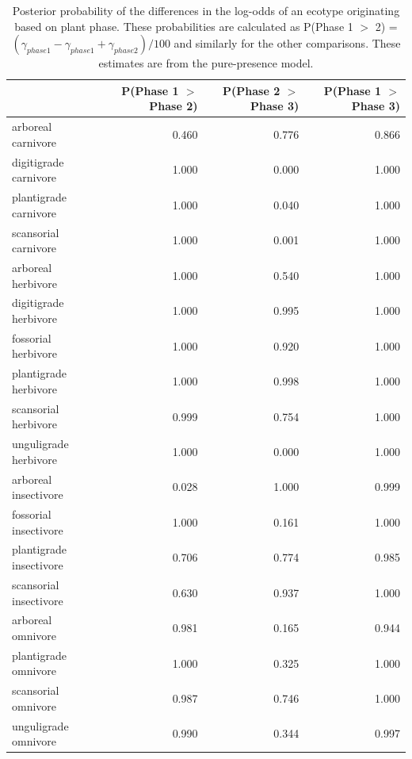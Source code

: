 \documentclass[12pt,letterpaper]{article}
\begin{document}
\begin{table}[ht]
  \centering
  \caption[Posterior probablity estimates of differences in occurrence by plant phase]{Posterior probability of the differences in the log-odds of an ecotype originating based on plant phase. These probabilities are calculated as P(Phase 1 \(>\) 2) = \( (\gamma_{phase 1} - \gamma_{phase 1} + \gamma_{phase 2}) / 100\) and similarly for the other comparisons. These estimates are from the pure-presence model.}
  \label{tab:occur_plant}
  \begin{tabular}{ l r r r }
    \hline
    & P(Phase 1 $>$ Phase 2) & P(Phase 2 $>$ Phase 3) & P(Phase 1 $>$ Phase 3) \\ 
    \hline
    arboreal carnivore & 0.460 & 0.776 & 0.866 \\ 
    digitigrade carnivore & 1.000 & 0.000 & 1.000 \\ 
    plantigrade carnivore & 1.000 & 0.040 & 1.000 \\ 
    scansorial carnivore & 1.000 & 0.001 & 1.000 \\ 
    arboreal herbivore & 1.000 & 0.540 & 1.000 \\ 
    digitigrade herbivore & 1.000 & 0.995 & 1.000 \\ 
    fossorial herbivore & 1.000 & 0.920 & 1.000 \\ 
    plantigrade herbivore & 1.000 & 0.998 & 1.000 \\ 
    scansorial herbivore & 0.999 & 0.754 & 1.000 \\ 
    unguligrade herbivore & 1.000 & 0.000 & 1.000 \\ 
    arboreal insectivore & 0.028 & 1.000 & 0.999 \\ 
    fossorial insectivore & 1.000 & 0.161 & 1.000 \\ 
    plantigrade insectivore & 0.706 & 0.774 & 0.985 \\ 
    scansorial insectivore & 0.630 & 0.937 & 1.000 \\ 
    arboreal omnivore & 0.981 & 0.165 & 0.944 \\ 
    plantigrade omnivore & 1.000 & 0.325 & 1.000 \\ 
    scansorial omnivore & 0.987 & 0.746 & 1.000 \\ 
    unguligrade omnivore & 0.990 & 0.344 & 0.997 \\ 
    \hline
  \end{tabular}
\end{table}
\end{document}
